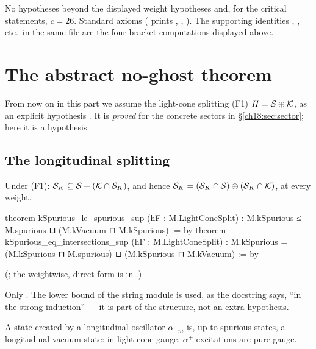 \begin{status}
No hypotheses beyond the displayed weight hypotheses and, for the critical statements, $c=26$.  Standard
axioms ( prints ,
, ).  The supporting identities
, , etc.\ in the same file are
the four bracket computations displayed above.
\end{status}

\section{The abstract no-ghost theorem}\label{ch18:sec:abstractnoghost}

From now on in this part we assume the light-cone splitting (F1) $H=\mathcal{S}\oplus\mathcal{K}$, as an explicit
hypothesis .  It is \emph{proved} for the concrete sectors in
\S\ref{ch18:sec:sector}; here it is a hypothesis.

\subsection{The longitudinal splitting}

\begin{theorem}\label{ch18:thm:longitudinal}
Under (F1): $\mathcal{S}_K\subseteq\mathcal{S}+(\mathcal{K}\cap\mathcal{S}_K)$, and hence $\mathcal{S}_K=(\mathcal{S}_K\cap\mathcal{S})\oplus(\mathcal{S}_K\cap\mathcal{K})$, at every weight.
\end{theorem}
\begin{leancode}
theorem kSpurious_le_spurious_sup (hF : M.LightConeSplit) :
    M.kSpurious ≤ M.spurious ⊔ (M.kVacuum ⊓ M.kSpurious) := by
theorem kSpurious_eq_intersections_sup (hF : M.LightConeSplit) :
    M.kSpurious = (M.kSpurious ⊓ M.spurious) ⊔ (M.kSpurious ⊓ M.kVacuum) := by
\end{leancode}
(; the weightwise, direct form is
 in .)
\begin{dictionary}
Only .  The lower bound  of the string module is used, as the docstring says, ``in
the strong induction'' — it is part of the structure, not an extra hypothesis.
\end{dictionary}
\begin{physics}
A state created by a longitudinal oscillator $\alpha^+_{-m}$ is, up to spurious states, a longitudinal
vacuum state: in light-cone gauge, $\alpha^+$ excitations are pure gauge.
\end{physics}
